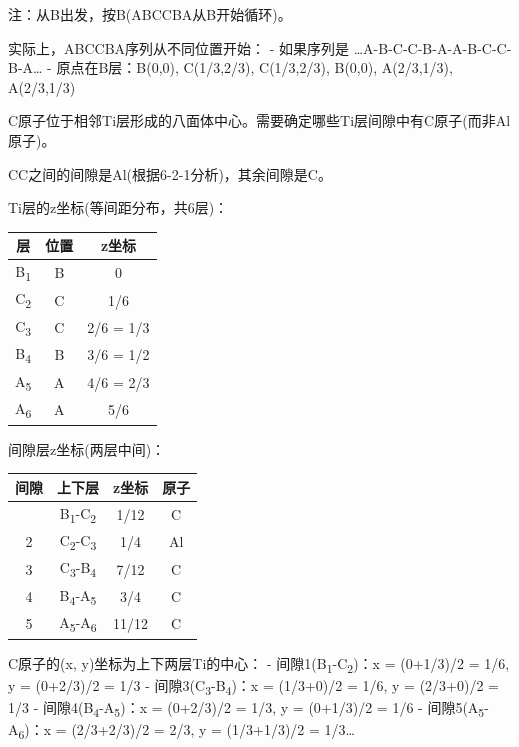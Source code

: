 注：从B出发，按B(ABCCBA从B开始循环)。

实际上，ABCCBA序列从不同位置开始：
- 如果序列是 \ldots A-B-C-C-B-A-A-B-C-C-B-A\ldots{}
- 原点在B层：B(0,0), C(1/3,2/3), C(1/3,2/3), B(0,0), A(2/3,1/3), A(2/3,1/3)

C原子位于相邻Ti层形成的八面体中心。需要确定哪些Ti层间隙中有C原子(而非Al原子)。

CC之间的间隙是Al(根据6-2-1分析)，其余间隙是C。

Ti层的z坐标(等间距分布，共6层)：

{\def\LTcaptype{none} %
\begin{longtable}[]{@{}ccc@{}}
\toprule\noalign{}
层 & 位置 & z坐标 \\
\midrule\noalign{}
\endhead
\bottomrule\noalign{}
\endlastfoot
B\textsubscript{1} & B & 0 \\
C\textsubscript{2} & C & 1/6 \\
C\textsubscript{3} & C & 2/6 = 1/3 \\
B\textsubscript{4} & B & 3/6 = 1/2 \\
A\textsubscript{5} & A & 4/6 = 2/3 \\
A\textsubscript{6} & A & 5/6 \\
\end{longtable}
}

间隙层z坐标(两层中间)：

{\def\LTcaptype{none} %
\begin{longtable}[]{@{}cccc@{}}
\toprule\noalign{}
间隙 & 上下层 & z坐标 & 原子 \\
\midrule\noalign{}
\endhead
\bottomrule\noalign{}
\endlastfoot
1 & B\textsubscript{1}-C\textsubscript{2} & 1/12 & C \\
2 & C\textsubscript{2}-C\textsubscript{3} & 1/4 & Al \\
3 & C\textsubscript{3}-B\textsubscript{4} & 7/12 & C \\
4 & B\textsubscript{4}-A\textsubscript{5} & 3/4 & C \\
5 & A\textsubscript{5}-A\textsubscript{6} & 11/12 & C \\
\end{longtable}
}

C原子的(x, y)坐标为上下两层Ti的中心：
- 间隙1(B\textsubscript{1}-C\textsubscript{2})：x = (0+1/3)/2 = 1/6, y = (0+2/3)/2 = 1/3
- 间隙3(C\textsubscript{3}-B\textsubscript{4})：x = (1/3+0)/2 = 1/6, y = (2/3+0)/2 = 1/3
- 间隙4(B\textsubscript{4}-A\textsubscript{5})：x = (0+2/3)/2 = 1/3, y = (0+1/3)/2 = 1/6
- 间隙5(A\textsubscript{5}-A\textsubscript{6})：x = (2/3+2/3)/2 = 2/3, y = (1/3+1/3)/2 = 1/3\ldots{}

